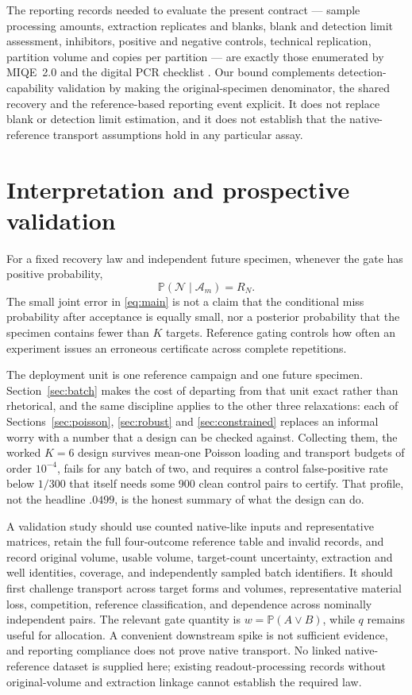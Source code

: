 \documentclass[11pt]{article}
\theoremstyle{remark}\newtheorem{remark}[theorem]{Remark}
\newcommand{\Prob}{\mathbb P}
\newcommand{\Neg}{\mathcal N}
\begin{document}
The reporting records needed to evaluate the present contract --- sample
processing amounts, extraction replicates and blanks, blank and detection limit
assessment, inhibitors, positive and negative controls, technical replication,
partition volume and copies per partition --- are exactly those enumerated by
MIQE~2.0 \cite{miqe2025} and the digital PCR checklist \cite{dmiqe}. Our bound
complements detection-capability validation by making the original-specimen
denominator, the shared recovery and the reference-based reporting event
explicit. It does not replace blank or detection limit estimation, and it does
not establish that the native-reference transport assumptions hold in any
particular assay.

\section{Interpretation and prospective validation}\label{sec:discussion}
For a fixed recovery law and independent future specimen, whenever the gate has
positive probability,
\[
\Prob(\Neg\mid\mathcal A_m)=R_N.
\]
The small joint error in \eqref{eq:main} is not a claim that the conditional miss
probability after acceptance is equally small, nor a posterior probability that
the specimen contains fewer than $K$ targets. Reference gating controls how often
an experiment issues an erroneous certificate across complete repetitions.

The deployment unit is one reference campaign and one future specimen.
Section~\ref{sec:batch} makes the cost of departing from that unit exact rather
than rhetorical, and the same discipline applies to the other three relaxations:
each of Sections~\ref{sec:poisson}, \ref{sec:robust} and \ref{sec:constrained}
replaces an informal worry with a number that a design can be checked against.
Collecting them, the worked $K=6$ design survives mean-one Poisson loading and
transport budgets of order $10^{-4}$, fails for any batch of two, and requires a
control false-positive rate below $1/300$ that itself needs some 900 clean
control pairs to certify. That profile, not the headline $.0499$, is the honest
summary of what the design can do.

A validation study should use counted native-like inputs and representative
matrices, retain the full four-outcome reference table and invalid records, and
record original volume, usable volume, target-count uncertainty, extraction and
well identities, coverage, and independently sampled batch identifiers. It should
first challenge transport across target forms and volumes, representative
material loss, competition, reference classification, and dependence across
nominally independent pairs. The relevant gate quantity is $w=\Prob(A\lor B)$,
while $q$ remains useful for allocation. A convenient downstream spike is not
sufficient evidence, and reporting compliance does not prove native transport. No
linked native-reference dataset is supplied here; existing readout-processing
records without original-volume and extraction linkage cannot establish the
required law.
\end{document}
